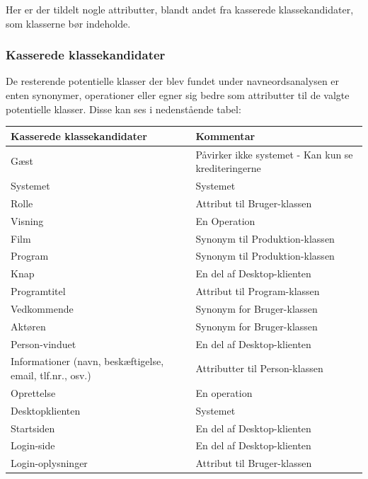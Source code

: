\noindent
Her er der tildelt nogle attributter, blandt andet fra kasserede klassekandidater, som klasserne bør indeholde.

\subsubsection{Kasserede klassekandidater}
De resterende potentielle klasser der blev fundet under navneordsanalysen er enten synonymer, operationer eller egner sig bedre som attributter til de valgte potentielle klasser. Disse kan ses i nedenstående tabel: 

\begin{table}[H]
    \begin{tabularx}{\textwidth}{|X|X|}
        \hline
        \textbf{Kasserede klassekandidater} & \textbf{Kommentar} \\
        \hline
        Gæst & Påvirker ikke systemet - Kan kun se krediteringerne\\
        \hline
        Systemet & Systemet  \\
        \hline
        Rolle   & Attribut til Bruger-klassen\\
        \hline
        Visning  & En Operation\\
        \hline
        Film & Synonym til Produktion-klassen\\ 
        \hline
        Program & Synonym til Produktion-klassen\\ 
        \hline
        Knap & En del af Desktop-klienten\\
        \hline
        Programtitel & Attribut til Program-klassen\\
        \hline
        Vedkommende & Synonym for Bruger-klassen\\
        \hline
        Aktøren &  Synonym for Bruger-klassen\\
        \hline
        Person-vinduet & En del af Desktop-klienten\\
        \hline
        Informationer (navn, beskæftigelse, email, tlf.nr., osv.) &  Attributter til Person-klassen\\
        \hline
        Oprettelse & En operation \\
        \hline
        Desktopklienten &  Systemet\\
        \hline
        Startsiden &  En del af Desktop-klienten\\
        \hline
        Login-side & En del af Desktop-klienten\\
        \hline
        Login-oplysninger & Attribut til Bruger-klassen\\

\end{tabularx}
\end{table}
